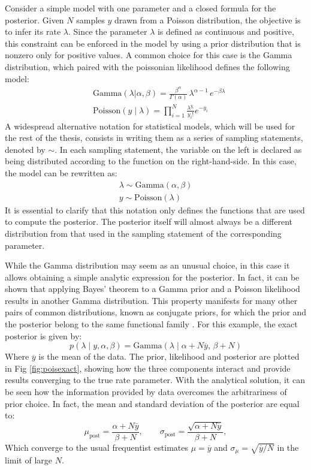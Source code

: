 Consider a simple model with one parameter and a closed formula for the posterior. Given $N$ samples $y$ drawn from a
Poisson distribution, the objective is to infer its rate $\lambda$. 
Since the parameter $\lambda$ is defined as continuous and positive, this constraint can be enforced in the model by using a prior distribution that is nonzero only for positive values. A common choice for this case is the Gamma distribution, which paired with the poissonian likelihood defines the following model:
\begin{eqnarray}
    &{\mathrm{Gamma}}(\lambda|\alpha,\beta)={\frac{\beta^{\alpha}}{\Gamma(\alpha)}}\,\lambda^{\alpha-1}\,{e}^{-\beta \lambda}\\
    &\text{Poisson}(y\mid\lambda) = \prod_{i=1}^N \frac{\lambda^{y_i}}{y_i!}e^{-y_i}
\end{eqnarray}
A widespread alternative notation for statistical models, which will be used for the rest of the thesis, consists in
writing them as a series of sampling statements, denoted by $\sim$. In each sampling statement, the variable on the
left is declared as being distributed according to the function on the right-hand-side. In this case, the model can be
rewritten as:
\begin{eqnarray}
    \lambda \sim \text{Gamma}(\alpha, \beta) \\
    y \sim \text{Poisson}(\lambda)
\end{eqnarray}
It is essential to clarify that this notation only defines the functions that are used to compute the posterior. The
posterior itself will almost always be a different distribution from that used in the sampling statement of the corresponding
parameter.

While the Gamma distribution may seem as an unusual choice, in this case it allows obtaining a simple analytic expression for
the posterior. In fact, it can be shown that applying Bayes' theorem to a Gamma prior and a Poisson likelihood results
in another Gamma distribution. This property manifests for many other pairs of common distributions, known as conjugate
priors, for which the prior and the posterior belong to the same functional family \cite{diaconis1979conjugate}. For this example, the exact posterior is given by:
\begin{equation}
    p(\lambda\mid y, \alpha, \beta) = \text{Gamma}(\lambda\mid \alpha + N \overline{y},\, \beta + N)
    \label{eq:gamma_post}
\end{equation}
Where $\overline{y}$ is the mean of the data. The prior, likelihood and posterior are plotted in Fig \ref{fig:poisexact},
showing how the three components interact and provide results converging to the true rate parameter. With the analytical solution, it can be seen how the information provided by data overcomes the arbitrariness of prior choice. In fact, the mean and standard deviation of the posterior are equal to:
\begin{equation}
    \mu_{\text{post}}=\frac{\alpha + N \overline{y}}{\beta + N},\qquad     \sigma_{\text{post}}=\frac{\sqrt{\alpha + N \overline{y}}}{\beta + N},
\end{equation}
Which converge to the usual frequentist estimates $\mu=\overline{y}$ and $\sigma_\mu=\sqrt{\overline{y}/N}$ in the limit of large $N$.


